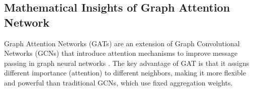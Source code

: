 \documentclass[aps, prd, showpacs, floatfix, superscriptaddress, twocolumn, nofootinbib, preprintnumbers, longbibliography]{revtex4-2}
\begin{document}





\subsection{Mathematical Insights of Graph Attention Network}

Graph Attention Networks (GATs) are an extension of Graph Convolutional Networks (GCNs) that introduce attention mechanisms to improve message passing in graph neural networks \cite{velivckovic2017graph}. The key advantage of GAT is that it assigns different importance (attention) to different neighbors, making it more flexible and powerful than traditional GCNs, which use fixed aggregation weights.
\end{document}
